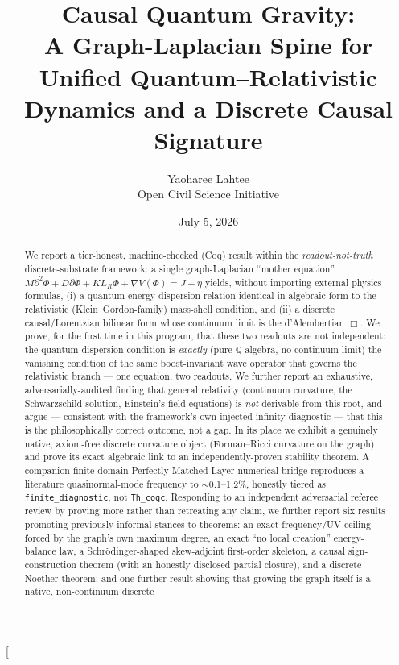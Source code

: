 \documentclass[10pt,twocolumn]{article}
\title{\textbf{Causal Quantum Gravity:\\
A Graph-Laplacian Spine for Unified Quantum--Relativistic\\
Dynamics and a Discrete Causal Signature}}
\author{Yaoharee Lahtee\\
\small Open Civil Science Initiative}
\date{July 5, 2026}
\begin{document}
\twocolumn[
  \begin{@twocolumnfalse}
    \maketitle
    \begin{abstract}
    \noindent We report a tier-honest, machine-checked (Coq) result within the
    \emph{readout-not-truth} discrete-substrate framework: a single graph-Laplacian
    ``mother equation'' $M\partial^2\Phi + D\partial\Phi + K L_R\Phi + \nabla V(\Phi) = J-\eta$
    yields, without importing external physics formulas, (i) a quantum energy-dispersion
    relation identical in algebraic form to the relativistic (Klein--Gordon-family)
    mass-shell condition, and (ii) a discrete causal/Lorentzian bilinear form whose
    continuum limit is the d'Alembertian $\Box$. We prove, for the first time in this
    program, that these two readouts are not independent: the quantum dispersion
    condition is \emph{exactly} (pure $\mathbb{Q}$-algebra, no continuum limit) the
    vanishing condition of the same boost-invariant wave operator that governs the
    relativistic branch --- one equation, two readouts. We further report an
    exhaustive, adversarially-audited finding that general relativity (continuum
    curvature, the Schwarzschild solution, Einstein's field equations) is \emph{not}
    derivable from this root, and argue --- consistent with the framework's own
    injected-infinity diagnostic --- that this is the philosophically correct outcome,
    not a gap. In its place we exhibit a genuinely native, axiom-free discrete
    curvature object (Forman--Ricci curvature on the graph) and prove its exact
    algebraic link to an independently-proven stability theorem. A companion
    finite-domain Perfectly-Matched-Layer numerical bridge reproduces a literature
    quasinormal-mode frequency to $\sim$0.1--1.2\%, honestly tiered as
    \texttt{finite\_diagnostic}, not \texttt{Th\_coqc}. Responding to an independent
    adversarial referee review by proving more rather than retreating any claim, we
    further report six results promoting previously informal stances to theorems: an
    exact frequency/UV ceiling forced by the graph's own maximum degree, an exact
    ``no local creation'' energy-balance law, a Schr\"odinger-shaped skew-adjoint
    first-order skeleton, a causal sign-construction theorem (with an honestly
    disclosed partial closure), and a discrete Noether theorem; and one further
    result showing that growing the graph itself is a native, non-continuum discrete

\end{abstract}
\end{@twocolumnfalse}
\end{document}
